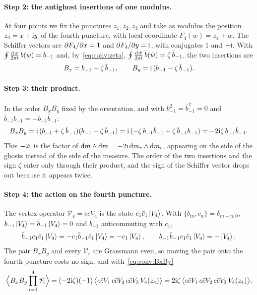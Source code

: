 \paragraph{Step 2: the antighost insertions of one modulus.}
At four points we fix the punctures $z_1, z_2, z_3$ and take as modulus the position $z_4 = x + \mathrm{i} y$ of the fourth puncture, with local coordinate $F_4(w) = z_4 + w$.
The Schiffer vectors are $\partial F_4 / \partial x = 1$ and $\partial F_4 / \partial y = \mathrm{i}$, with conjugates $1$ and $- \mathrm{i}$.
With $\oint \frac{\mathrm{d} w}{2\pi \mathrm{i}} \, b(w) = b_{-1}$ and, by~\eqref{eq:conv:zeta}, $\oint \frac{\mathrm{d} \bar w}{2\pi \mathrm{i}} \, \bar b(\bar w) = \zeta \, \bar b_{-1}$, the two insertions are
\begin{equation}
  \label{eq:conv:Bxy}
  B_x
    = b_{-1} + \zeta \, \bar b_{-1},
  \qquad
  B_y
    = \mathrm{i} \, (b_{-1} - \zeta \, \bar b_{-1}).
\end{equation}

\paragraph{Step 3: their product.}
In the order $B_x B_y$ fixed by the orientation, and with $b_{-1}^2 = \bar b_{-1}^2 = 0$ and $\bar b_{-1} b_{-1} = - b_{-1} \bar b_{-1}$:
\begin{equation}
  \label{eq:conv:BxBy}
  B_x B_y
    = \mathrm{i} \, (b_{-1} + \zeta \, \bar b_{-1}) (b_{-1} - \zeta \, \bar b_{-1})
    = \mathrm{i} \, (- \zeta \, b_{-1} \bar b_{-1} + \zeta \, \bar b_{-1} b_{-1})
    = - 2 \mathrm{i} \zeta \, b_{-1} \bar b_{-1}.
\end{equation}
This $- 2 \mathrm{i}$ is the factor of $\mathrm{d} m \wedge \mathrm{d} \bar m = - 2 \mathrm{i} \, \mathrm{d} m_r \wedge \mathrm{d} m_i$, appearing on the side of the ghosts instead of the side of the measure.
The order of the two insertions and the sign $\zeta$ enter only through their product, and the sign of the Schiffer vector drops out because it appears twice.

\paragraph{Step 4: the action on the fourth puncture.}
The vertex operator $\mathscr V_4 = c \bar c V_4$ is the state $c_1 \bar c_1 \ket{V_4}$.
With $\{ b_m, c_n \} = \delta_{m+n,0}$, $b_{-1} \ket{V_4} = \bar b_{-1} \ket{V_4} = 0$ and $\bar b_{-1}$ anticommuting with $c_1$,
\begin{equation}
  \label{eq:conv:ghost-strip}
  \bar b_{-1} c_1 \bar c_1 \ket{V_4}
    = - c_1 \bar b_{-1} \bar c_1 \ket{V_4}
    = - c_1 \ket{V_4},
  \qquad
  b_{-1} \bar b_{-1} c_1 \bar c_1 \ket{V_4}
    = - \ket{V_4}.
\end{equation}
The pair $B_x B_y$ and every $\mathscr V_i$ are Grassmann even, so moving the pair onto the fourth puncture costs no sign, and with~\eqref{eq:conv:BxBy}
\begin{equation}
  \label{eq:conv:four-point-correlator}
  \Big\langle B_x B_y \prod_{i=1}^4 \mathscr V_i \Big\rangle
    = (- 2 \mathrm{i} \zeta) (-1) \, \big\langle c \bar c V_1 \, c \bar c V_2 \, c \bar c V_3 \, V_4(z_4) \big\rangle
    = 2 \mathrm{i} \zeta \, \big\langle c \bar c V_1 \, c \bar c V_2 \, c \bar c V_3 \, V_4(z_4) \big\rangle.
\end{equation}

